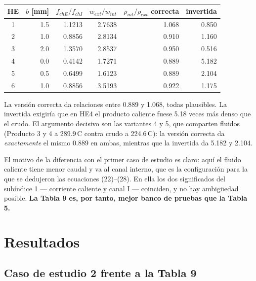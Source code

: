 \documentclass[11pt,a4paper]{article}
\begin{document}
\begin{table}[h]
\centering
\begin{tabular}{crrrrr}
\toprule
HE & $b$ [mm] & $f_{chE}/f_{chI}$ & $w_{ext}/w_{int}$ & $\rho_{int}/\rho_{ext}$ correcta & invertida\\
\midrule
1 & 1.5 & 1.1213 & 2.7638 & 1.068 & 0.850\\
2 & 1.0 & 0.8856 & 2.8134 & 0.910 & 1.160\\
3 & 2.0 & 1.3570 & 2.8537 & 0.950 & 0.516\\
4 & 0.0 & 0.4142 & 1.7271 & 0.889 & 5.182\\
5 & 0.5 & 0.6499 & 1.6123 & 0.889 & 2.104\\
6 & 1.0 & 0.8856 & 3.5193 & 0.922 & 1.175\\
\bottomrule
\end{tabular}
\end{table}

La versión correcta da relaciones entre 0.889 y 1.068, todas plausibles. La invertida exigiría
que en HE4 el producto caliente fuese 5.18 veces más denso que el crudo. El argumento decisivo
son las variantes 4 y 5, que comparten fluidos (Producto 3 y 4 a 289.9\,\textdegree C contra
crudo a 224.6\,\textdegree C): la versión correcta da \emph{exactamente} el mismo 0.889 en
ambas, mientras que la invertida da 5.182 y 2.104.

El motivo de la diferencia con el primer caso de estudio es claro: aquí el fluido caliente
tiene menor caudal y va al canal interno, que es la configuración para la que se dedujeron las
ecuaciones (22)--(28). En ella los dos significados del subíndice 1 --- corriente caliente y
canal I --- coinciden, y no hay ambigüedad posible. \textbf{La Tabla 9 es, por tanto, mejor
banco de pruebas que la Tabla 5.}

\section{Resultados}

\subsection{Caso de estudio 2 frente a la Tabla 9}
\end{document}
